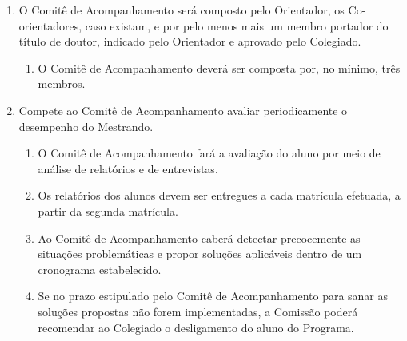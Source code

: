 \documentclass{article}
\begin{document}
\begin{enumerate}
	\item O Comitê de Acompanhamento será composto pelo Orientador, os Co-orientadores, caso existam, e por pelo menos mais um membro portador do título de doutor, indicado pelo Orientador e aprovado pelo Colegiado.
	\begin{enumerate}
		\item O Comitê de Acompanhamento deverá ser composta por, no mínimo, três membros.
	\end{enumerate}


	\item Compete ao Comitê de Acompanhamento avaliar periodicamente o desempenho do Mestrando.
	\begin{enumerate}
		\item O Comitê de Acompanhamento fará a avaliação do aluno por meio de análise de relatórios e de entrevistas.
		\item Os relatórios dos alunos devem ser entregues a cada matrícula efetuada, a partir da segunda matrícula.
		\item Ao Comitê de Acompanhamento caberá detectar precocemente as situações problemáticas e propor soluções aplicáveis dentro de um cronograma estabelecido.
		\item Se no prazo estipulado pelo Comitê de Acompanhamento para sanar as soluções propostas não forem implementadas, a Comissão poderá recomendar ao Colegiado o desligamento do aluno do Programa.
	\end{enumerate}

\end{enumerate}
\end{document}

